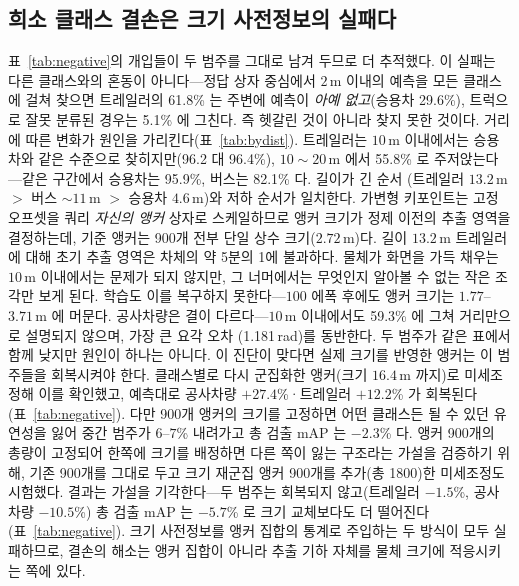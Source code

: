 \documentclass[conference]{IEEEtran}
\newcommand{\measured}[1]{#1}
\begin{document}
\subsection{희소 클래스 결손은 크기 사전정보의 실패다}
\label{sec:anchors}
표~\ref{tab:negative}의 개입들이 두 범주를 그대로 남겨 두므로 더 추적했다. 이 실패는
다른 클래스와의 혼동이 아니다---정답 상자 중심에서 $2\,$m 이내의 예측을 모든 클래스에 걸쳐
찾으면 트레일러의 \measured{61.8}\% 는 주변에 예측이 \emph{아예 없고}(승용차
\measured{29.6}\%), 트럭으로 잘못 분류된 경우는 \measured{5.1}\% 에 그친다. 즉 헷갈린
것이 아니라 찾지 못한 것이다. 거리에 따른 변화가 원인을 가리킨다(표~\ref{tab:bydist}).
트레일러는 $10\,$m 이내에서는 승용차와 같은 수준으로 찾히지만(\measured{96.2} 대
\measured{96.4}\%), $10\sim20\,$m 에서 \measured{55.8}\% 로 주저앉는다---같은 구간에서
승용차는 \measured{95.9}\%, 버스는 \measured{82.1}\% 다. 길이가 긴 순서
(트레일러 $13.2$\,m $>$ 버스 $\sim11$\,m $>$ 승용차 $4.6$\,m)와 저하 순서가 일치한다. 가변형 키포인트는 고정 오프셋을 쿼리 \emph{자신의 앵커} 상자로 스케일하므로
앵커 크기가 정제 이전의 추출 영역을 결정하는데, 기준 앵커는 900개 전부 단일 상수
크기($2.72$\,m)다. 길이 $13.2$\,m 트레일러에 대해 초기 추출 영역은 차체의 약 5분의 1에 불과하다. 물체가
화면을 가득 채우는 $10\,$m 이내에서는 문제가 되지 않지만, 그 너머에서는 무엇인지
알아볼 수 없는 작은 조각만 보게 된다. 학습도 이를 복구하지 못한다---$100$ 에폭 후에도 앵커 크기는
\measured{$1.77$--$3.71\,$m} 에 머문다. 공사차량은 결이 다르다---$10\,$m 이내에서도
\measured{59.3}\% 에 그쳐 거리만으로 설명되지 않으며, 가장 큰 요각 오차
(\measured{1.181}\,rad)를 동반한다. 두 범주가 같은 표에서 함께 낮지만 원인이 하나는
아니다. 이 진단이 맞다면 실제 크기를 반영한 앵커는 이 범주들을 회복시켜야 한다. 클래스별로
다시 군집화한 앵커(크기 $16.4$\,m 까지)로 미세조정해 이를 확인했고, 예측대로 공사차량 \measured{$+27.4$}\%·트레일러
\measured{$+12.2$}\% 가 회복된다(표~\ref{tab:negative}). 다만 900개 앵커의 크기를
고정하면 어떤 클래스든 될 수 있던 유연성을 잃어 중간 범주가 \measured{$6$--$7$}\%
내려가고 총 검출 mAP 는 \measured{$-2.3$}\% 다. 앵커 900개의 총량이 고정되어 한쪽에 크기를 배정하면 다른 쪽이 잃는 구조라는 가설을 검증하기 위해,
기존 900개를 그대로 두고 크기 재군집 앵커 900개를 추가(총 1800)한 미세조정도 시험했다.
결과는 가설을 기각한다---두 범주는 회복되지 않고(트레일러 \measured{$-1.5$}\%,
공사차량 \measured{$-10.5$}\%) 총 검출 mAP 는 \measured{$-5.7$}\% 로 크기 교체보다도
더 떨어진다(표~\ref{tab:negative}). 크기 사전정보를 앵커 집합의 통계로 주입하는 두
방식이 모두 실패하므로, 결손의 해소는 앵커 집합이 아니라 추출 기하 자체를 물체 크기에
적응시키는 쪽에 있다.
\end{document}
